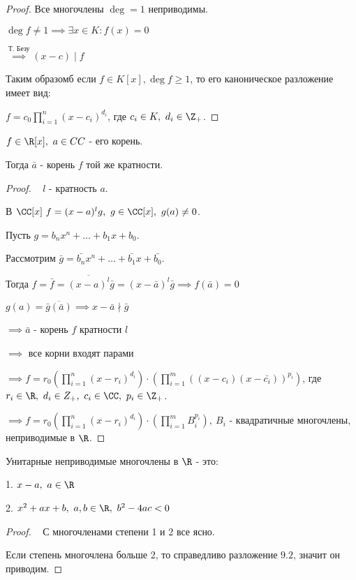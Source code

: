 \begin{proof}
    Все многочлены $\deg = 1$ неприводимы.

    $\deg f \neq 1 \implies \exists x \in K: f(x) = 0$

    $\overset{\text{Т. Безу}}{\implies} (x - c) \mid f$

    Таким образомб если $f \in K[x], \deg f \ge 1$, то его каноническое разложение имеет вид:

    $f = c_0\prod\limits_{i = 1}^n (x - c_i)^{d_i}$, где $c_i \in K,~d_i \in \Z_+$.
\end{proof}

\begin{theorem-non}
    $f \in \R[x],~ a \in CC$ - его корень.

    Тогда $\bar{a}$ - корень $f$ той же кратности.
\end{theorem-non}

\begin{proof}~
    $l$ - кратность $a$.

    В $\CC[x]~f = (x - a)^lg,~ g \in \CC[x],~ g(a) \neq 0$.

    Пусть $g = b_nx^n + \dots + b_1x + b_0$.

    Рассмотрим $\bar{g} = \bar{b_n}x^n + \dots + \bar{b_1}x + \bar{b_0}$.

    Тогда $f = \bar{f} = \overline{(x - a)^l}\bar{g} = (x - \bar{a})^l\bar{g} \implies f(\bar{a}) = 0$

    $g(a) = \overline{\bar{g}(\bar{a})} \implies x - \bar{a} \nmid \bar{g}$

    $\implies \bar{a}$ - корень $f$ кратности $l$

    $\implies$ все корни входят парами

    $\implies f = r_0\left(\prod\limits_{i = 1}^n (x - r_i)^{d_i}\right) \cdot \left(\prod\limits_{i = 1}^m ((x - c_i)(x - \bar{c_i}))^{p_i}\right)$, где $r_i \in \R,~d_i \in Z_+,~c_i \in \CC,~p_i \in \Z_+$.

    $\implies f = r_0\left(\prod\limits_{i = 1}^n (x - r_i)^{d_i}\right) \cdot \left(\prod\limits_{i = 1}^m B_i^{p_i}\right),~ B_i$ - квадратичные многочлены, неприводимые в $\R$.
\end{proof}

\begin{theorem-non}
    Унитарные неприводимые многочлены в $\R$ - это:

    1. $x - a,~ a \in \R$

    2. $x^2 + ax + b,~ a, b \in \R,~ b^2 - 4ac < 0$
\end{theorem-non}

\begin{proof}~
    С многочленами степени 1 и 2 все ясно.

    Если степень многочлена больше 2, то справедливо разложение $9.2$, значит он приводим.
\end{proof}


